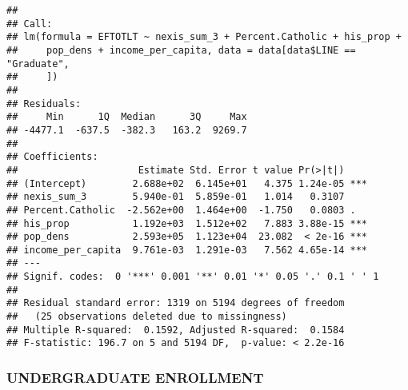 \documentclass[]{article}
\newenvironment{Shaded}{\begin{snugshade}}{\end{snugshade}}
\newcommand{\KeywordTok}[1]{\textcolor[rgb]{0.13,0.29,0.53}{\textbf{#1}}}
\newcommand{\DataTypeTok}[1]{\textcolor[rgb]{0.13,0.29,0.53}{#1}}
\newcommand{\DecValTok}[1]{\textcolor[rgb]{0.00,0.00,0.81}{#1}}
\newcommand{\StringTok}[1]{\textcolor[rgb]{0.31,0.60,0.02}{#1}}
\newcommand{\OperatorTok}[1]{\textcolor[rgb]{0.81,0.36,0.00}{\textbf{#1}}}
\newcommand{\NormalTok}[1]{#1}
\begin{document}
\begin{verbatim}
## 
## Call:
## lm(formula = EFTOTLT ~ nexis_sum_3 + Percent.Catholic + his_prop + 
##     pop_dens + income_per_capita, data = data[data$LINE == "Graduate", 
##     ])
## 
## Residuals:
##     Min      1Q  Median      3Q     Max 
## -4477.1  -637.5  -382.3   163.2  9269.7 
## 
## Coefficients:
##                     Estimate Std. Error t value Pr(>|t|)    
## (Intercept)        2.688e+02  6.145e+01   4.375 1.24e-05 ***
## nexis_sum_3        5.940e-01  5.859e-01   1.014   0.3107    
## Percent.Catholic  -2.562e+00  1.464e+00  -1.750   0.0803 .  
## his_prop           1.192e+03  1.512e+02   7.883 3.88e-15 ***
## pop_dens           2.593e+05  1.123e+04  23.082  < 2e-16 ***
## income_per_capita  9.761e-03  1.291e-03   7.562 4.65e-14 ***
## ---
## Signif. codes:  0 '***' 0.001 '**' 0.01 '*' 0.05 '.' 0.1 ' ' 1
## 
## Residual standard error: 1319 on 5194 degrees of freedom
##   (25 observations deleted due to missingness)
## Multiple R-squared:  0.1592, Adjusted R-squared:  0.1584 
## F-statistic: 196.7 on 5 and 5194 DF,  p-value: < 2.2e-16
\end{verbatim}

\subsubsection{UNDERGRADUATE
ENROLLMENT}\label{undergraduate-enrollment-1}

\begin{Shaded}
\end{Shaded}
\end{document}
